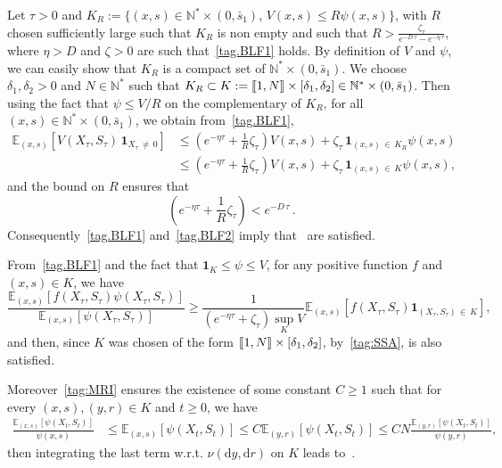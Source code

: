 \documentclass[10pt]{amsart}
\theoremstyle{definition}\newtheorem{defi}[theo]{Definition}\newtheorem{rema}[theo]{Remark}\newtheorem{exam}[theo]{Example}\newtheorem{exem}[theo]{Example}\newtheorem{nota}[theo]{Notation}
\newcommand{\llbracket}{\mathopen{[\mkern -2.7mu[}}
\newcommand{\rrbracket}{\mathclose{]\mkern -2.7mu]}}
\newcommand{\NN}{\mathbb{N}}
\newcommand{\EE}{\mathbb{E}}
\newcommand{\X}{\NN^* \times (0,\bar s_1)}
\newcommand{\dif}{\mathrm{d}}
\newcommand{\1}{\mathbf{1}}
\begin{document}
Let $\tau>0$ and $K_R:=\{(x,s)\in \X, \, V(x,s)\leq R \psi(x,s) \}$, with $R$ chosen sufficiently large such that $K_R$ is non empty and such that $R>\frac{\zeta_\tau}{e^{-D\,\tau}-e^{-\eta\,\tau}}$, where $\eta>D$ and $\zeta>0$ are such that~\eqref{tag.BLF1} holds. By definition of $V$ and $\psi$, we can easily show that $K_R$ is a compact set of $\X$. We choose $\delta_1,\delta_2>0$ and $N \in \NN^*$ such that $K_R\subset K:=\llbracket 1,N\rrbracket\times [\delta_1,\delta_2]\in \X$. Then using the fact that $\psi \leq V/R$ on the complementary of $K_R$, for all $(x,s)\in \X$, we obtain from~\eqref{tag.BLF1},
\begin{align*}
\EE_{(x,s)}\left[V(X_\tau,S_\tau)\,\1_{X_\tau\,\neq\,0}\right] & \leq \left(e^{-\eta \tau} + \frac{1}{R} \zeta_\tau \right) V(x,s)+ \zeta_\tau \,\1_{(x,s)\,\in\,K_R} \psi(x,s)\\
& \leq \left(e^{-\eta \tau} + \frac{1}{R} \zeta_\tau \right) V(x,s)+ \zeta_\tau \, \1_{(x,s)\,\in\,K} \psi(x,s),
\end{align*}
and the bound on $R$ ensures that
\[
\left(e^{-\eta \tau} + \frac{1}{R} \zeta_\tau \right)<e^{-D\,\tau}\,.
\]
Consequently~\eqref{tag.BLF1} and~\eqref{tag.BLF2} imply that~\cite[Assumptions~(A1) and (A2)]{BCGM} are satisfied.

From~\eqref{tag.BLF1} and the fact that $\1_K \leq \psi\leq V$, for any positive function $f$ and $(x,s) \in K$, we have
\[
\frac{\EE_{(x,s)}\left[f\left(X_\tau, S_\tau\right) \psi\left(X_\tau, S_\tau\right) \right]}{\EE_{(x,s)}\left[\psi\left(X_\tau, S_\tau\right)\right]} \geq \frac{1 }{\left(e^{-\eta \tau } +\zeta_\tau\right) \sup_K V} \EE_{(x,s)}\left[f(X_\tau, S_\tau) \1_{(X_\tau, S_\tau)\,\in\,K} \right],
\]
and then, since $K$ was chosen of the form $\llbracket 1,N\rrbracket\times [\delta_1,\delta_2]$, by~\eqref{tag:SSA}, \cite[Assumption~(A3)]{BCGM} is also satisfied.

Moreover~\eqref{tag:MRI} ensures the existence of some constant $C\geq 1$ such that for every $(x,s), (y,r) \in K$ and $t\geq 0$, we have
\begin{align*}
\frac{\EE_{(x,s)}\left[\psi(X_t, S_t) \right]}{\psi(x,s)} &\leq \EE_{(x,s)}\left[\psi(X_t, S_t) \right]
\leq C \EE_{(y,r)}\left[\psi(X_t, S_t) \right] \leq CN \frac{\EE_{(y,r)}\left[\psi(X_t, S_t) \right]}{\psi(y,r)},
\end{align*}
then integrating the last term w.r.t. $\nu(\dif y,\dif r)$ on $K$ leads to~\cite[Assumption~(A4)]{BCGM}.
\end{document}
